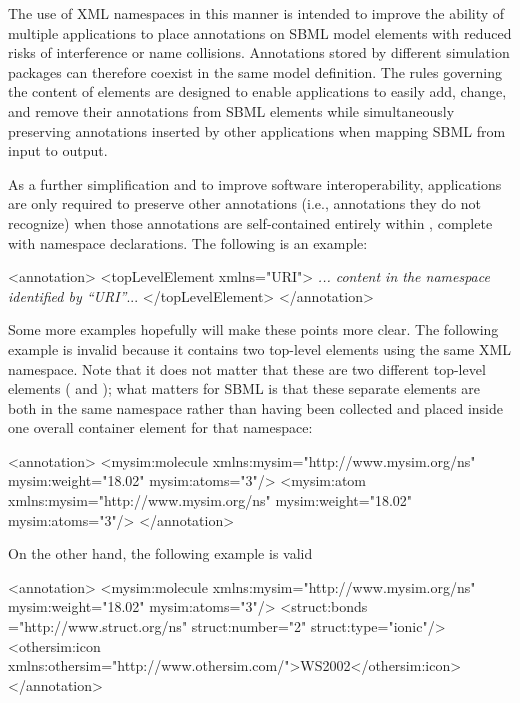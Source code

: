 The use of XML namespaces in this manner is intended to improve
the ability of multiple applications to place annotations on SBML
model elements with reduced risks of interference or name
collisions.  Annotations stored by different simulation packages
can therefore coexist in the same model definition.  The rules
governing the content of  elements are designed
to enable applications to easily add, change, and remove their
annotations from SBML elements while simultaneously preserving
annotations inserted by other applications when mapping SBML from
input to output.

As a further simplification and to improve software
interoperability, applications are only required to preserve other
annotations (i.e., annotations they do not recognize) when those
annotations are self-contained entirely within ,
complete with namespace declarations.  The following is an
example:

\begin{example}
<annotation>
    <topLevelElement xmlns="URI">
       \textrm{\emph{... content in the namespace identified by \textquotedblleft{}URI\textquotedblright}...}
    </topLevelElement>
</annotation>
\end{example}

Some more examples hopefully will make these points more clear.
The following example is invalid because it contains two top-level
elements using the same  XML namespace.  Note that it does not
matter that these are two different top-level elements
( and ); what matters for
SBML is that these separate elements are both in the same
namespace rather than having been collected and placed inside one
overall container element for that namespace:

\begin{example}
<annotation>
   <mysim:molecule xmlns:mysim="http://www.mysim.org/ns" mysim:weight="18.02" mysim:atoms="3"/>
   <mysim:atom xmlns:mysim="http://www.mysim.org/ns" mysim:weight="18.02" mysim:atoms="3"/>
</annotation>
\end{example}

On the other hand, the following example is valid

\begin{example}
<annotation>
   <mysim:molecule xmlns:mysim="http://www.mysim.org/ns" mysim:weight="18.02" mysim:atoms="3"/>
   <struct:bonds ="http://www.struct.org/ns" struct:number="2" struct:type="ionic"/>
   <othersim:icon xmlns:othersim="http://www.othersim.com/">WS2002</othersim:icon>
</annotation>
\end{example}

